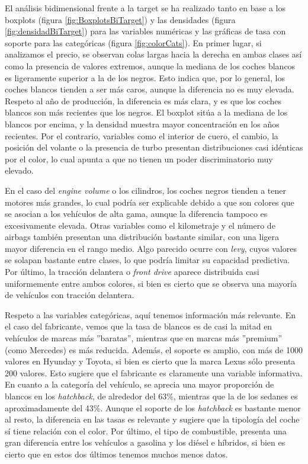 \documentclass[a4paper,onecolumn]{extarticle}
\begin{document}
\begin{sloppypar}
El análisis bidimensional frente a la target se ha realizado tanto en base a los boxplots (figura \ref{fig:BoxplotsBiTarget}) y las densidades (figura \ref{fig:densidadBiTarget})
para las variables numéricas y las gráficas de tasa con soporte para las categóricas (figura \ref{fig:colorCats}). En primer lugar, si analizamos el precio, se observan 
colas largas hacia la derecha en ambas clases así como la presencia de valores extremos, aunque la mediana de los coches blancos es ligeramente superior a la de los negros. 
Esto indica que, por lo general, los coches blancos tienden a ser más caros, aunque la diferencia no es muy elevada. Respeto al año de producción, la diferencia es más clara, y es 
que los coches blancos son más recientes que los negros. El boxplot sitúa a la mediana de los blancos por encima, y la densidad muestra mayor concentración en los años recientes.
Por el contrario, variables como el interior de cuero, el cambio, la posición del volante o la presencia de turbo presentan distribuciones casi idénticas por el color, lo cual 
apunta a que no tienen un poder discriminatorio muy elevado.

En el caso del \textit{engine volume} o los cilindros, los coches negros tienden a tener motores más grandes, lo cual podría ser explicable debido a que son colores que se 
asocian a los vehículos de alta gama, aunque la diferencia tampoco es excesivamente elevada. Otras variables como el kilometraje y el número de airbags también presentan una 
distribución bastante similar, con una ligera mayor diferencia en el rango medio. Algo parecido ocurre con \textit{levy}, cuyos valores se solapan bastante entre clases, lo que 
podría limitar su capacidad predictiva. Por último, la tracción delantera o \textit{front drive} aparece distribuida casi uniformemente entre ambos colores, si bien es cierto
que se observa una mayoría de vehículos con tracción delantera.

Respeto a las variables categóricas, aquí tenemos información más relevante. En el caso del fabricante, vemos que la tasa de blancos es de casi la mitad en vehículos de marcas 
más ''baratas'', mientras que en marcas más ''premium'' (como Mercedes) es más reducida. Además, el soporte es amplio, con más de 1000 valores en Hyunday y Toyota, si bien es cierto 
que la marca Lexus sólo presenta 200 valores. Esto sugiere que el fabricante es claramente una variable informativa. En cuanto a la categoría del vehículo, se aprecia una 
mayor proporción de blancos en los \textit{hatchback}, de alrededor del 63\%, mientras que la de los sedanes es aproximadamente del 43\%. Aunque el soporte de los \textit{hatchback}
es bastante menor al resto, la diferencia en las tasas es relevante y sugiere que la tipología del coche sí tiene relación con el color. Por último, el tipo de combustible, 
presenta una gran diferencia entre los vehículos a gasolina y los diésel e híbridos, si bien es cierto que en estos dos últimos tenemos muchos menos datos.


\end{sloppypar}
\end{document}
